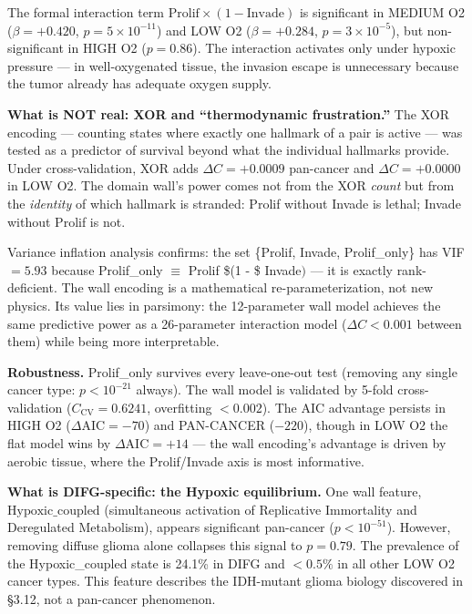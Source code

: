 \documentclass[
  11pt,
]{article}
\begin{document}
The formal interaction term
\(\mathrm{Prolif} \times (1 - \mathrm{Invade})\) is significant in
MEDIUM O2 (\(\beta = +0.420\), \(p = 5 \times 10^{-11}\)) and LOW O2
(\(\beta = +0.284\), \(p = 3 \times 10^{-5}\)), but non-significant in
HIGH O2 (\(p = 0.86\)). The interaction activates only under hypoxic
pressure --- in well-oxygenated tissue, the invasion escape is
unnecessary because the tumor already has adequate oxygen supply.

\textbf{What is NOT real: XOR and ``thermodynamic frustration.''} The
XOR encoding --- counting states where exactly one hallmark of a pair is
active --- was tested as a predictor of survival beyond what the
individual hallmarks provide. Under cross-validation, XOR adds
\(\Delta C = +0.0009\) pan-cancer and \(\Delta C = +0.0000\) in LOW O2.
The domain wall's power comes not from the XOR \emph{count} but from the
\emph{identity} of which hallmark is stranded: Prolif without Invade is
lethal; Invade without Prolif is not.

Variance inflation analysis confirms: the set \{Prolif, Invade,
Prolif\_only\} has VIF \(= 5.93\) because Prolif\_only \(\equiv\) Prolif
\$\times (1 - \$ Invade\()\) --- it is exactly rank-deficient. The wall
encoding is a mathematical re-parameterization, not new physics. Its
value lies in parsimony: the 12-parameter wall model achieves the same
predictive power as a 26-parameter interaction model
(\(\Delta C < 0.001\) between them) while being more interpretable.

\textbf{Robustness.} Prolif\_only survives every leave-one-out test
(removing any single cancer type: \(p < 10^{-21}\) always). The wall
model is validated by 5-fold cross-validation
(\(C_\mathrm{CV} = 0.6241\), overfitting \(< 0.002\)). The AIC advantage
persists in HIGH O2 (\(\Delta\mathrm{AIC} = -70\)) and PAN-CANCER
(\(-220\)), though in LOW O2 the flat model wins by
\(\Delta\mathrm{AIC} = +14\) --- the wall encoding's advantage is driven
by aerobic tissue, where the Prolif/Invade axis is most informative.

\textbf{What is DIFG-specific: the Hypoxic equilibrium.} One wall
feature, \(\mathrm{Hypoxic\_coupled}\) (simultaneous activation of
Replicative Immortality and Deregulated Metabolism), appears significant
pan-cancer (\(p < 10^{-51}\)). However, removing diffuse glioma alone
collapses this signal to \(p = 0.79\). The prevalence of the
Hypoxic\_coupled state is 24.1\% in DIFG and \(< 0.5\%\) in all other
LOW O2 cancer types. This feature describes the IDH-mutant glioma
biology discovered in §3.12, not a pan-cancer phenomenon.
\end{document}
